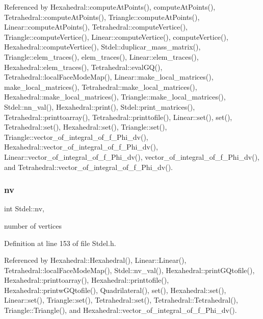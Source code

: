 Referenced by Hexahedral\+::compute\+At\+Points(), compute\+At\+Points(), Tetrahedral\+::compute\+At\+Points(), Triangle\+::compute\+At\+Points(), Linear\+::compute\+At\+Points(), Tetrahedral\+::compute\+Vertice(), Triangle\+::compute\+Vertice(), Linear\+::compute\+Vertice(), compute\+Vertice(), Hexahedral\+::compute\+Vertice(), Stdel\+::duplicar\+\_\+mass\+\_\+matrix(), Triangle\+::elem\+\_\+traces(), elem\+\_\+traces(), Linear\+::elem\+\_\+traces(), Hexahedral\+::elem\+\_\+traces(), Tetrahedral\+::eval\+G\+Q(), Tetrahedral\+::local\+Face\+Mode\+Map(), Linear\+::make\+\_\+local\+\_\+matrices(), make\+\_\+local\+\_\+matrices(), Tetrahedral\+::make\+\_\+local\+\_\+matrices(), Hexahedral\+::make\+\_\+local\+\_\+matrices(), Triangle\+::make\+\_\+local\+\_\+matrices(), Stdel\+::nn\+\_\+val(), Hexahedral\+::print(), Stdel\+::print\+\_\+matrices(), Tetrahedral\+::printtoarray(), Tetrahedral\+::printtofile(), Linear\+::set(), set(), Tetrahedral\+::set(), Hexahedral\+::set(), Triangle\+::set(), Triangle\+::vector\+\_\+of\+\_\+integral\+\_\+of\+\_\+f\+\_\+\+Phi\+\_\+dv(), Hexahedral\+::vector\+\_\+of\+\_\+integral\+\_\+of\+\_\+f\+\_\+\+Phi\+\_\+dv(), Linear\+::vector\+\_\+of\+\_\+integral\+\_\+of\+\_\+f\+\_\+\+Phi\+\_\+dv(), vector\+\_\+of\+\_\+integral\+\_\+of\+\_\+f\+\_\+\+Phi\+\_\+dv(), and Tetrahedral\+::vector\+\_\+of\+\_\+integral\+\_\+of\+\_\+f\+\_\+\+Phi\+\_\+dv().

\mbox{\label{classStdel_a20c0e35541cab4a1f07974659ae7a9ad}} 
\subsubsection{\texorpdfstring{nv}{nv}}
{\footnotesize\ttfamily int Stdel\+::nv\hspace{0.3cm}{\ttfamily [protected]}, {\ttfamily [inherited]}}



number of vertices 



Definition at line 153 of file Stdel.\+h.



Referenced by Hexahedral\+::\+Hexahedral(), Linear\+::\+Linear(), Tetrahedral\+::local\+Face\+Mode\+Map(), Stdel\+::nv\+\_\+val(), Hexahedral\+::print\+G\+Qtofile(), Hexahedral\+::printtoarray(), Hexahedral\+::printtofile(), Hexahedral\+::printw\+G\+Qtofile(), Quadrilateral(), set(), Hexahedral\+::set(), Linear\+::set(), Triangle\+::set(), Tetrahedral\+::set(), Tetrahedral\+::\+Tetrahedral(), Triangle\+::\+Triangle(), and Hexahedral\+::vector\+\_\+of\+\_\+integral\+\_\+of\+\_\+f\+\_\+\+Phi\+\_\+dv().

